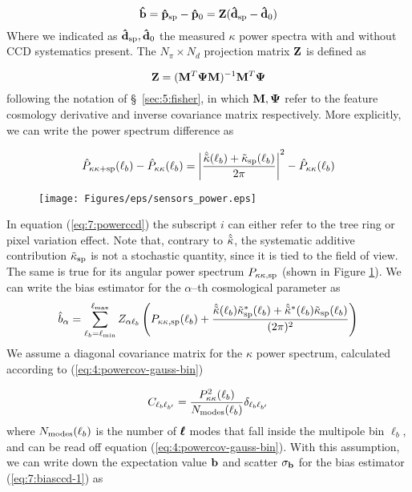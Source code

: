 \begin{equation}
\label{eq:7:biasccd}
\mathbf{\hat{b}} = \mathbf{\hat{p}}_{\rm sp}-\mathbf{\hat{p}}_0 = \mathbf{Z}(\mathbf{\hat{d}}_{\rm sp}-\mathbf{\hat{d}}_0)
\end{equation}
%
Where we indicated as $\mathbf{\hat{d}}_{\rm sp},\mathbf{\hat{d}}_0$ the measured $\kappa$ power spectra with and without CCD systematics present. The $N_\pi\times N_d$ projection matrix $\mathbf{Z}$ is defined as 

\begin{equation}
\label{eq:7:zeta}
\mathbf{Z} = (\mathbf{M}^T\mathbf{\Psi}\mathbf{M})^{-1}\mathbf{M}^T\mathbf{\Psi}
\end{equation}
%
following the notation of \S~\ref{sec:5:fisher}, in which $\mathbf{M},\mathbf{\Psi}$ refer to the feature cosmology derivative and inverse covariance matrix respectively. More explicitly, we can write the power spectrum difference as 

\begin{equation}
\label{eq:7:powerccd}
\hat{P}_{\kappa\kappa+{\rm sp}}(\ell_b)-\hat{P}_{\kappa\kappa}(\ell_b) = \left\vert\frac{\hat{\tilde{\kappa}}(\ell_b)+\tilde{\kappa}_{\rm sp}(\ell_b)}{2\pi}\right\vert^2-\hat{P}_{\kappa\kappa}(\ell_b) 
\end{equation} 
%
\begin{figure}
\begin{center}
\texttt{[image: Figures/eps/sensors\_power.eps]}
\end{center}
\caption{}
\label{fig:7:ccdpow}
\end{figure}
%
In equation (\ref{eq:7:powerccd}) the subscript $i$ can either refer to the tree ring or pixel variation effect. Note that, contrary to $\hat{\tilde{\kappa}}$, the systematic additive contribution $\tilde{\kappa}_{\rm sp}$ is not a stochastic quantity, since it is tied to the field of view. The same is true for its angular power spectrum $P_{\kappa\kappa,{\rm sp}}$ (shown in Figure \ref{fig:7:ccdpow}). We can write the bias estimator for the $\alpha$--th cosmological parameter as 
\begin{equation}
\label{eq:7:biasccd-1}
\hat{b}_\alpha = \sum_{\ell_b=\ell_{\rm min}}^{\ell_{\rm max}} Z_{\alpha\ell_b}\left(P_{\kappa\kappa,{\rm sp}}(\ell_b)+\frac{\hat{\tilde{\kappa}}(\ell_b)\tilde{\kappa}_{\rm sp}^*(\ell_b)+\hat{\tilde{\kappa}}^*(\ell_b)\tilde{\kappa}_{\rm sp}(\ell_b)}{(2\pi)^2}\right)
\end{equation}
%
We assume a diagonal covariance matrix for the $\kappa$ power spectrum, calculated according to (\ref{eq:4:powercov-gauss-bin}) 

\begin{equation}
\label{eq:7:diagcov}
C_{\ell_b\ell_{b'}} = \frac{P^2_{\kappa\kappa}(\ell_b)}{N_{\rm modes}(\ell_b)}\delta_{\ell_b\ell_{b'}}
\end{equation}
%
where $N_{\rm modes}(\ell_b)$ is the number of $\pmb{\ell}$ modes that fall inside the multipole bin $\ell_b$, and can be read off equation (\ref{eq:4:powercov-gauss-bin}). With this assumption, we can write down the expectation value $\mathbf{b}$ and scatter $\sigma_{\mathbf{b}}$ for the bias estimator (\ref{eq:7:biasccd-1}) as  

